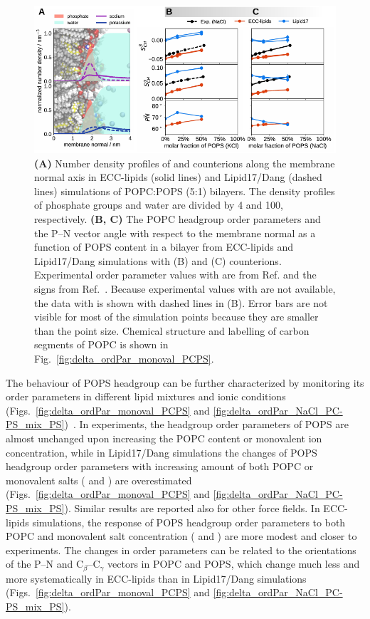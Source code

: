 \documentclass[journal=jctcce,manuscript=article]{achemso}
\newlength{\figwidth}
\newlength{\figwidthfull}
\begin{document}
\begin{figure}[!tbp] 
  \centering 
  \includegraphics[width=\figwidthfull]{../img/deltaOP_mix_PC-PS.pdf} 
  \caption{\label{fig:delta_ordPar_NaCl_PC-PS_mix_PC} 
    \textbf{(A)} Number density profiles of  and  counterions along the membrane normal axis
    in ECC-lipids (solid lines) and Lipid17/Dang (dashed lines) simulations of POPC:POPS (5:1) bilayers.  
    The density profiles of phosphate groups and water are divided by 4 and 100, respectively.  
    \textbf{(B, C)} The POPC headgroup order parameters and the P--N vector angle
    with respect to the membrane normal as a function of POPS content in a bilayer
    from ECC-lipids and Lipid17/Dang simulations with  (B) and  (C) counterions.
    Experimental order parameter values with  are from Ref. 
    and the signs from Ref.~. Because experimental values with  are
    not available, the data with  is shown with dashed lines in (B).
    Error bars are not visible for most of the simulation points because they are smaller than the point size.
    Chemical structure and labelling of carbon segments of POPC is shown in Fig.~\ref{fig:delta_ordPar_monoval_PCPS}. 
  }
\end{figure} 

The behaviour of POPS headgroup can be further characterized by monitoring its order parameters in different
lipid mixtures and ionic conditions (Figs.~\ref{fig:delta_ordPar_monoval_PCPS} and \ref{fig:delta_ordPar_NaCl_PC-PS_mix_PS})~\cite{NMRlipidsIV,roux90}.
In experiments, the headgroup order parameters of POPS are almost unchanged upon increasing the POPC content or monovalent ion concentration, 
while in Lipid17/Dang simulations the changes of POPS headgroup order parameters with increasing amount of
both POPC or monovalent salts ( and ) are overestimated 
(Figs.~\ref{fig:delta_ordPar_monoval_PCPS} and \ref{fig:delta_ordPar_NaCl_PC-PS_mix_PS}).
Similar results are reported also for other force fields. \cite{NMRlipidsIV}
In ECC-lipids simulations, the response of POPS headgroup order parameters to both POPC and monovalent salt concentration ( and )
are more modest and closer to experiments. 
The changes in order parameters can be related to the orientations of the P--N and C$_{\beta}$--C$_{\gamma}$
vectors in POPC and POPS, which change much less and more systematically in ECC-lipids
than in Lipid17/Dang simulations 
(Figs.~\ref{fig:delta_ordPar_monoval_PCPS} and \ref{fig:delta_ordPar_NaCl_PC-PS_mix_PS}).
\end{document}
